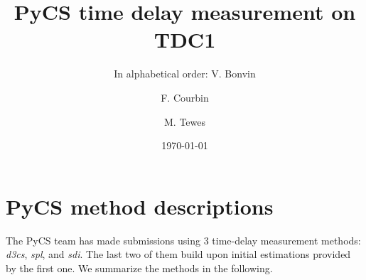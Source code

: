 \documentclass[traditabstract]{aa}
\begin{document}
\title{PyCS time delay measurement on TDC1}
\author{ In alphabetical order:
V. Bonvin\inst{\ref{epfl}} \and
F. Courbin\inst{\ref{epfl}} \and
M. Tewes\inst{\ref{bonn}}
}


\date{\today}

\maketitle



\section{PyCS method descriptions}

The PyCS team has made submissions using 3 time-delay measurement methods: \emph{d3cs}, \emph{spl}, and \emph{sdi}. The last two of them build upon initial estimations provided by the first one. We summarize the methods in the following. 
\end{document}
